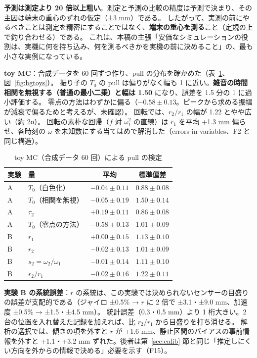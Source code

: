 \documentclass[paper=a4paper,fontsize=10pt,twocolumn,column_gap=2zw,line_length=24zw,number_of_lines=46,head_space=20mm]{jlreq}
\begin{document}
\textbf{予測は測定より 20 倍以上粗い}。測定と予測の比較の精度は予測で決まり、その主因は端末の重心のずれの仮定（±3 mm）である。
したがって、実測の前にやるべきことは測定を精密にすることではなく、\textbf{端末の重心を測る}こと（定規の上で釣り合わせる）である。
これは、本稿の主張「安価なシミュレーションの役割は、実機に何を持ち込み、何を測るべきかを実機の前に決めること」の、最も小さな実例になっている。

\textbf{toy MC}：合成データを 60 回ずつ作り、pull の分布を確かめた（表~\ref{tab:bgtoy}、図~\ref{fig:bgtoys}）。
振り子の $T_0$ の pull は偏りがなく幅も 1 に近い。\textbf{雑音の時間相関を無視する（普通の最小二乗）と幅は 1.50} になり、誤差を 1.5 分の 1 に過小評価する。
零点の方法はわずかに偏る（$-0.58\pm0.13$。ピークから求める振幅が減衰で偏るためと考えるが、未確認）。
回転では、$r_2/r_1$ の幅が 1.22 とやや広い（約 2σ）。
回転の素朴な回帰（$f$ 対 $\omega_1^2$ の直線）は $r_1$ を平均 +1.3 mm 偏らせ、各時刻の $\omega$ を未知数にする当てはめで解消した（errors-in-variables、F2 と同じ構造）。

\begin{table}[t]\centering\footnotesize
\caption{toy MC（合成データ 60 回）による pull の検定}\label{tab:bgtoy}
\setlength{\tabcolsep}{3pt}
\begin{tabular}{llcc}\toprule
実験 & 量 & 平均 & 標準偏差 \\\midrule
A & $T_0$（白色化） & $-0.04\pm0.11$ & $0.88\pm0.08$ \\
A & $T_0$（相関を無視） & $-0.05\pm0.19$ & $\mathbf{1.50\pm0.14}$ \\
A & $\tau_2$ & $+0.19\pm0.11$ & $0.86\pm0.08$ \\
A & $T_0$（零点の方法） & $\mathbf{-0.58\pm0.13}$ & $1.01\pm0.09$ \\
B & $r_1$ & $+0.00\pm0.15$ & $1.13\pm0.10$ \\
B & $r_2$ & $-0.02\pm0.13$ & $1.01\pm0.09$ \\
B & $s_2=\omega_2/\omega_1$ & $-0.01\pm0.14$ & $1.11\pm0.10$ \\
B & $r_2/r_1$ & $-0.02\pm0.16$ & $\mathbf{1.22\pm0.11}$ \\\bottomrule
\end{tabular}
\end{table}

\textbf{実験 B の系統誤差}：$r$ の系統は、この実験では決められないセンサーの目盛りの誤差が支配的である（ジャイロ ±0.5\% → $r$ に 2 倍で ±3.1・±9.0 mm、加速度 ±0.5\% → ±1.5・±4.5 mm）。
統計誤差（0.3・0.5 mm）より 1 桁大きい。2 台の位置を入れ替えた記録を加えれば、比 $r_2/r_1$ から目盛りを打ち消せる。
解析の選択では、傾きの項を外すと $r$ が +1.6 mm、静止区間のバイアスの事前情報を外すと +1.1・+3.2 mm ずれた。後者は第~\ref{sec:calib} 節と同じ「推定しにくい方向を外からの情報で決める」必要を示す（F15）。
\end{document}
